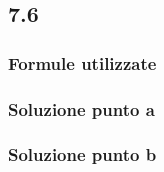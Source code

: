\documentclass[../../main.tex]{subfiles}
\begin{document}
\subsection*{7.6}
\subsubsection*{Formule utilizzate}
\subsubsection*{Soluzione punto a}
\subsubsection*{Soluzione punto b}
\newpage
\end{document}

